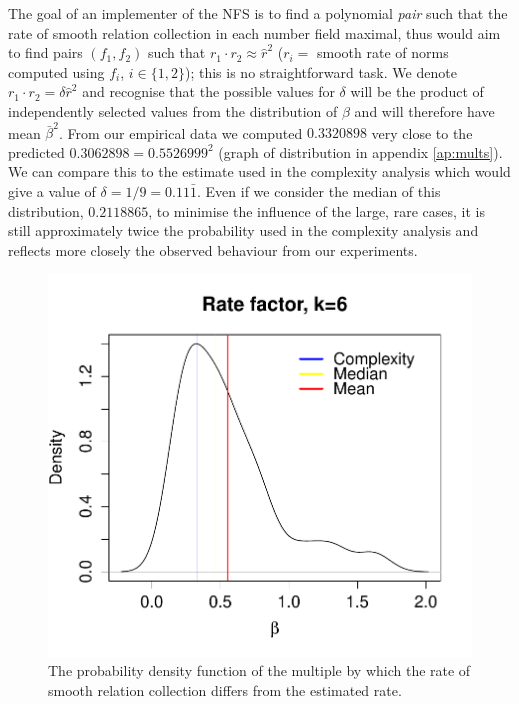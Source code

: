 \documentclass[a4paper, 12pt, envcountsect, runningheads]{llncs}
\numberwithin{figure}{section}
\numberwithin{equation}{section}
\begin{document}
The goal of an implementer of the NFS is to find a polynomial {\em pair} such that the rate of smooth relation collection in each number field maximal, thus would aim to find pairs $(f_1,f_2)$ such that $r_1\cdot r_2\approx\hat{r}^2$ ($r_i=$ smooth rate of norms computed using $f_i$, $i\in\{1,2\}$); this is no straightforward task. We denote $r_1\cdot r_2=\delta\hat{r}^2$ and recognise that the possible values for $\delta$ will be the product of independently selected values from the distribution of $\beta$ and will therefore have mean $\bar{\beta}^2$. From our empirical data we computed $0.3320898$ very close to the predicted $0.3062898=0.5526999^2$ (graph of distribution in appendix \ref{ap:mults}). We can compare this to the estimate used in the complexity analysis which would give a value of $\delta=1/9=0.11\bar{1}$. Even if we consider the median of this distribution, $0.2118865$, to minimise the influence of the large, rare cases, it is still approximately twice the probability used in the complexity analysis and reflects more closely the observed behaviour from our experiments.
\begin{center}
\begin{figure}\label{fig:mults}
\includegraphics[scale=0.7]{graphs/multiple_tests_plot}\caption{The probability density function of the multiple by which the rate of smooth relation collection differs from the estimated rate.}
\end{figure}
\vspace{-1cm}
\end{center}
\end{document}
